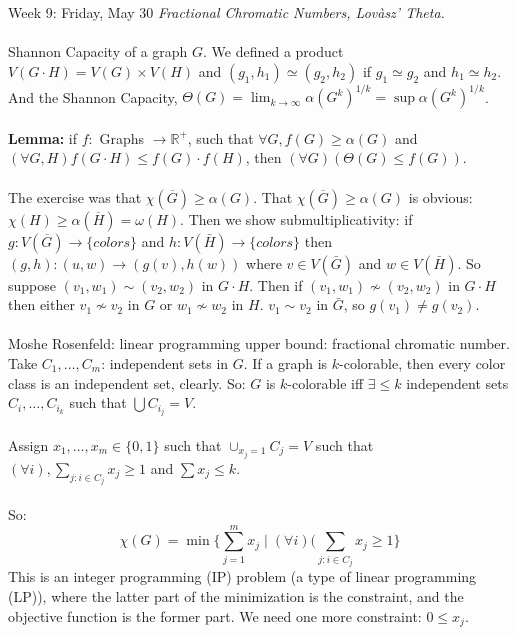 \documentclass[12pt]{article}
\theoremstyle{remark}
\newcommand{\R}{\mathbb{R}}
\begin{document}
\newpage

\label{26}\begin{section}{Week 9: Friday, May 30}
\indent\textit{Fractional Chromatic Numbers, Lov{\`a}sz' Theta.}
\\\\
Shannon Capacity of a graph $G$. We defined a product $V(G \cdot H) = V(G) \times V(H)$ and $(g_1,h_1) \simeq (g_2,h_2)$ if $g_1 \simeq g_2$ and $h_1 \simeq h_2$. And the Shannon Capacity, $\Theta(G) = \lim_{k \to \infty} \alpha(G^k)^{1/k} = \sup \alpha(G^k)^{1/k}$.
\\\\
\textbf{Lemma:} if $f:$ Graphs $\to \R^+$, such that $\forall G, f(G) \geq \alpha(G)$ and $(\forall G,H) f(G \cdot H) \leq f(G) \cdot f(H)$, then $(\forall G)(\Theta(G) \leq f(G))$.
\\\\
The exercise was that $\chi(\overline{G}) \geq \alpha(G)$. That $\chi(\overline{G}) \geq \alpha(G)$ is obvious: $\chi(H) \geq \alpha(\overline{H}) = \omega(H)$. Then we show submultiplicativity: if $g:V(\overline{G}) \to \{colors\}$ and $h:V(\bar{H}) \to \{colors\}$ then $(g,h) : (u,w) \to (g(v),h(w))$ where $v \in V(\bar{G})$ and $w \in V(\bar H)$. So suppose $(v_1,w_1) \sim (v_2,w_2)$ in $G \cdot H$. Then if $(v_1,w_1) \not \sim (v_2,w_2)$ in $G\cdot H$ then either $v_1 \not \sim v_2$ in $G$ or $w_1 \not \sim w_2$ in $H$. $v_1 \sim v_2$ in $\bar G$, so $g(v_1) \neq g(v_2)$.
\\\\
Moshe Rosenfeld: linear programming upper bound: fractional chromatic number. Take $C_1,\ldots,C_m$: independent sets in $G$. If a graph is $k$-colorable, then every color class is an independent set, clearly. So: $G$ is $k$-colorable iff $\exists \leq k$ independent sets $C_i,\ldots,C_{i_k}$ such that $\bigcup C_{i_j} = V$.
\\\\
Assign $x_1,\ldots,x_m \in \{0,1\}$ such that $\cup_{x_j = 1} C_j = V$ such that $(\forall i), \sum_{j : i \in C_j} x_j \geq 1$ and $\sum x_j \leq k$. 
\\\\
So:
$$\chi(G) = \min \{ \sum_{j=1}^m x_j \mid (\forall i)(\sum_{j : i \in C_j} x_j \geq 1\}$$
This is an integer programming (IP) problem (a type of linear programming (LP)), where the latter part of the minimization is the constraint, and the objective function is the former part. We need one more constraint: $0 \leq x_j$.
\\\\

\end{section}
\end{document}
